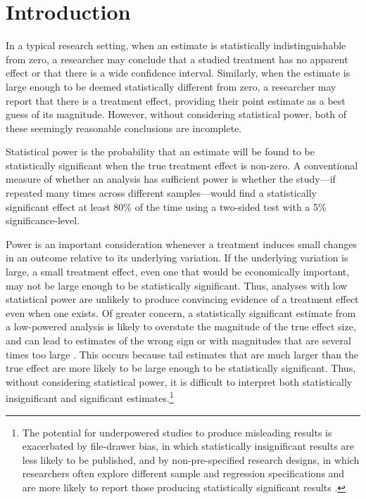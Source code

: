 \documentclass[12pt]{article}%
\begin{document}
\section{Introduction}


In a typical research setting, when an estimate is statistically indistinguishable from zero, a researcher may conclude that a studied treatment has no apparent effect or that there is a wide confidence interval.  
Similarly, when the estimate is large enough to be deemed statistically different from zero, a researcher may report that there is a treatment effect, providing their point estimate as a best guess of its magnitude.  
However, without considering statistical power, both of these seemingly reasonable conclusions are incomplete.

Statistical power is the probability that an estimate will be found to be statistically significant when the true treatment effect is non-zero.   
A conventional measure of whether an analysis has sufficient power is whether the study---if repeated many times across different samples---would find a statistically significant effect at least 80\% of the time using a two-sided test with a 5\% significance-level. 


Power is an important consideration whenever a treatment induces small changes in an outcome relative to its underlying variation. 
If the underlying variation is large, a small treatment effect, even one that would be economically important, may not be large enough to be statistically significant. 
Thus, analyses with low statistical power are unlikely to produce convincing evidence of a treatment effect even when one exists. 
Of greater concern, a statistically significant estimate from a low-powered analysis is likely to overstate the magnitude of the true effect size, and can lead to estimates of the wrong sign or with magnitudes that are several times too large \citep{Gelman2014}. 
This occurs because tail estimates that are much larger than the true effect are more likely to be large enough to be statistically significant. 
Thus, without considering statistical power, it is difficult to interpret both statistically insignificant and significant estimates.\footnote{The potential for underpowered studies to produce misleading results is exacerbated by file-drawer bias, in which statistically insignificant results are less likely to be published, and by non-pre-specified research designs, in which researchers often explore different sample and regression specifications and are more likely to report those producing statistically significant results \citep{Ioannidis2005a}.}  
\end{document}
